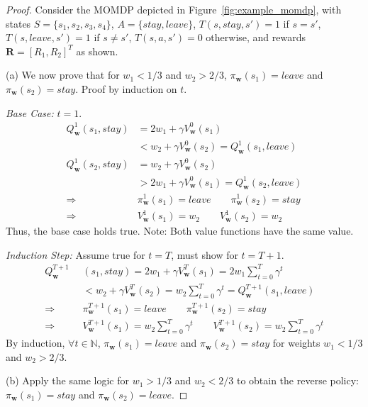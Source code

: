 \begin{proof}
Consider the MOMDP depicted in Figure~\ref{fig:example_momdp}, with states $S = \{s_1, s_2, s_3, s_4\}$, $A = \{stay, leave\}$, $T(s, stay, s') = 1$ if $s = s'$, $T(s, leave, s') = 1$ if $s \neq s'$, $T(s, a, s') = 0$ otherwise, and rewards $\mathbf{R} = [ R_1, R_2 ]^T$ as shown.

(a) We now prove that for $w_1 < 1/3$ and $w_2 > 2/3$, $\pi_\mathbf{w}(s_1) = leave$ and $\pi_\mathbf{w}(s_2) = stay$. Proof by induction on $t$.

\emph{Base Case:} $t = 1$.
\begin{align*}
    Q_\mathbf{w}^1(s_1, stay) &= 2 w_1 + \gamma V_\mathbf{w}^0(s_1) \\
        &< w_2 + \gamma V_\mathbf{w}^0(s_2) = Q_\mathbf{w}^1(s_1, leave) \\
    Q_\mathbf{w}^1(s_2, stay) &= w_2 + \gamma V_\mathbf{w}^0(s_2) \\
        &> 2 w_1 + \gamma V_\mathbf{w}^0(s_1) = Q_\mathbf{w}^1(s_2, leave) \\
    \Rightarrow \quad \quad &\pi_\mathbf{w}^1(s_1) = leave \quad \quad \pi_\mathbf{w}^1(s_2) = stay \\
    \Rightarrow \quad \quad &V_\mathbf{w}^1(s_1) = w_2 \quad \quad V_\mathbf{w}^1(s_2) = w_2
\end{align*}
Thus, the base case holds true. Note: Both value functions have the same value.

\emph{Induction Step:} Assume true for $t = T$, must show for $t = T + 1$.
\begin{align*}
    Q_\mathbf{w}^{T+1}&(s_1, stay) = 2 w_1 + \gamma V_\mathbf{w}^T(s_1) = 2 w_1 \sum_{t=0}^T \gamma^t \\
        &< w_2 + \gamma V_\mathbf{w}^T(s_2) = w_2 \sum_{t=0}^T \gamma^t = Q_\mathbf{w}^{T+1}(s_1, leave) \\
    \Rightarrow \quad \quad &\pi_\mathbf{w}^{T+1}(s_1) = leave \quad \quad \pi_\mathbf{w}^{T+1}(s_2) = stay \\
    \Rightarrow \quad \quad &V_\mathbf{w}^{T+1}(s_1) = w_2 \sum_{t=0}^T \gamma^t \quad \quad V_\mathbf{w}^{T+1}(s_2) = w_2 \sum_{t=0}^T \gamma^t 
\end{align*}
By induction, $\forall t \in \mathbb{N}$, $\pi_\mathbf{w}(s_1) = leave$ and $\pi_\mathbf{w}(s_2) = stay$ for weights $w_1 < 1/3$ and $w_2 > 2/3$.

(b) Apply the same logic for $w_1 > 1/3$ and $w_2 < 2/3$ to obtain the reverse policy: $\pi_\mathbf{w}(s_1) = stay$ and $\pi_\mathbf{w}(s_2) = leave$.


\end{proof}
